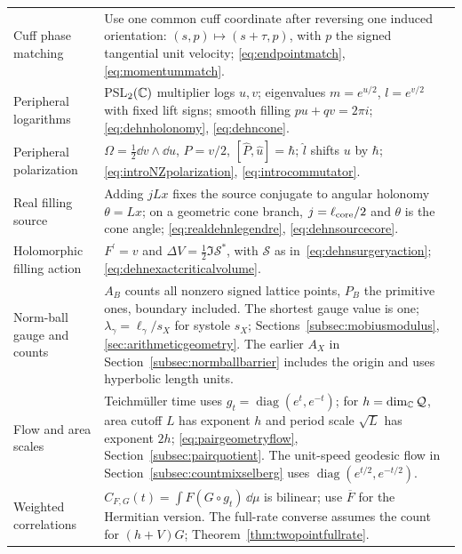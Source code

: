 \begin{longtable}{@{}>{\raggedright\arraybackslash}p{}
 >{\raggedright\arraybackslash}p{}@{}}
Cuff phase matching & Use one common cuff coordinate after reversing one induced orientation: $(s,p)\mapsto(s+\tau,p)$, with $p$ the signed tangential unit velocity; \eqref{eq:endpointmatch}, \eqref{eq:momentummatch}.\\
Peripheral logarithms & PSL$_2(\mathbb C)$ multiplier logs $u,v$; eigenvalues $m=e^{u/2}$, $l=e^{v/2}$ with fixed lift signs; smooth filling $pu+qv=2\pi i$; \eqref{eq:dehnholonomy}, \eqref{eq:dehncone}.\\
Peripheral polarization & $\Omega=\frac12\dd v\wedge\dd u$, $P=v/2$, $[\widehat P,\widehat u]=\hbar$; $\widehat l$ shifts $u$ by $\hbar$; \eqref{eq:introNZpolarization}, \eqref{eq:introcommutator}.\\
Real filling source & Adding $jLx$ fixes the source conjugate to angular holonomy $\theta=Lx$; on a geometric cone branch, $j=\ell_{\rm core}/2$ and $\theta$ is the cone angle; \eqref{eq:realdehnlegendre}, \eqref{eq:dehnsourcecore}.\\
Holomorphic filling action & $F^{\prime}=v$ and $\Delta V=\frac12\Im\mathcal S^*$, with $\mathcal S$ as in~\eqref{eq:dehnsurgeryaction}; \eqref{eq:dehnexactcriticalvolume}.\\
Norm-ball gauge and counts & $A_B$ counts all nonzero signed lattice points, $P_B$ the primitive ones, boundary included. The shortest gauge value is one; $\lambda_\gamma=\ell_\gamma/s_X$ for systole $s_X$; Sections~\ref{subsec:mobiusmodulus}, \ref{sec:arithmeticgeometry}. The earlier $A_X$ in Section~\ref{subsec:normballbarrier} includes the origin and uses hyperbolic length units.\\
Flow and area scales & Teichm\"uller time uses $g_t=\operatorname{diag}(e^t,e^{-t})$; for $h=\dim_{\mathbb C}\mathcal Q$, area cutoff $L$ has exponent $h$ and period scale $\sqrt L$ has exponent $2h$; \eqref{eq:pairgeometryflow}, Section~\ref{subsec:pairquotient}. The unit-speed geodesic flow in Section~\ref{subsec:countmixselberg} uses $\operatorname{diag}(e^{t/2},e^{-t/2})$.\\
Weighted correlations & $C_{F,G}(t)=\int F(G\circ g_t)\,\dd\mu$ is bilinear; use $\overline F$ for the Hermitian version. The full-rate converse assumes the count for $(h+V)G$; Theorem~\ref{thm:twopointfullrate}.\\
\bottomrule
\end{longtable}

